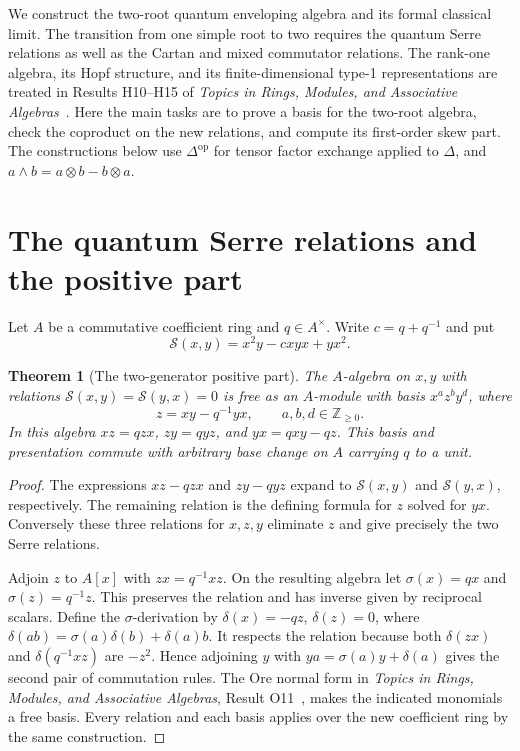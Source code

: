 \documentclass[11pt,oneside,openany]{book}
\newtheorem{theorem}{Theorem}[chapter]
\theoremstyle{definition}
\theoremstyle{remark}
\begin{document}
We construct the two-root quantum enveloping algebra and its formal
classical limit. The transition from one simple root to two requires
the quantum Serre relations as well as the Cartan and mixed
commutator relations. The rank-one algebra, its Hopf structure,
and its finite-dimensional type-1 representations are treated
in Results H10--H15 of \emph{Topics in Rings, Modules, and
Associative Algebras}~\cite[PDF pp.~25--28]{mg-rm03d}.
Here the main tasks are to prove a basis for the two-root algebra,
check the coproduct on the new relations, and compute its
first-order skew part. The constructions below use
\(\Delta^{\mathrm{op}}\) for tensor factor exchange applied to
\(\Delta\), and \(a\wedge b=a\otimes b-b\otimes a\).

\section{The quantum Serre relations and the positive part}

Let \(A\) be a commutative coefficient ring and \(q\in A^\times\).
Write \(c=q+q^{-1}\) and put
\[
 \mathcal S(x,y)=x^2y-cxyx+yx^2 .
\]

\begin{theorem}[The two-generator positive part]
\label{res:UQ01}
The \(A\)-algebra on \(x,y\) with relations
\(\mathcal S(x,y)=\mathcal S(y,x)=0\) is free as an
\(A\)-module with basis \(x^a z^b y^d\), where
\[
 z=xy-q^{-1}yx,\qquad a,b,d\in\mathbb Z_{\ge0}.
\]
In this algebra \(xz=qzx\), \(zy=qyz\), and \(yx=qxy-qz\).
This basis and presentation commute with arbitrary base change
on \(A\) carrying \(q\) to a unit.
\end{theorem}
\begin{proof}
The expressions \(xz-qzx\) and \(zy-qyz\) expand to
\(\mathcal S(x,y)\) and \(\mathcal S(y,x)\), respectively.
The remaining relation is the defining formula for \(z\)
solved for \(yx\). Conversely these three relations for
\(x,z,y\) eliminate \(z\) and give precisely the two Serre
relations.

Adjoin \(z\) to \(A[x]\) with \(zx=q^{-1}xz\).
On the resulting algebra let \(\sigma(x)=qx\) and
\(\sigma(z)=q^{-1}z\). This preserves the relation and
has inverse given by reciprocal scalars. Define the
\(\sigma\)-derivation by \(\delta(x)=-qz\), \(\delta(z)=0\),
where \(\delta(ab)=\sigma(a)\delta(b)+\delta(a)b\).
It respects the relation because both \(\delta(zx)\) and
\(\delta(q^{-1}xz)\) are \(-z^2\). Hence adjoining \(y\)
with \(ya=\sigma(a)y+\delta(a)\) gives the second pair
of commutation rules. The Ore normal form in
\emph{Topics in Rings, Modules, and Associative Algebras},
Result O11~\cite[PDF p.~34]{mg-rm03d}, makes the indicated
monomials a free basis. Every relation and each basis
applies over the new coefficient ring by the same construction.
\end{proof}
\end{document}
